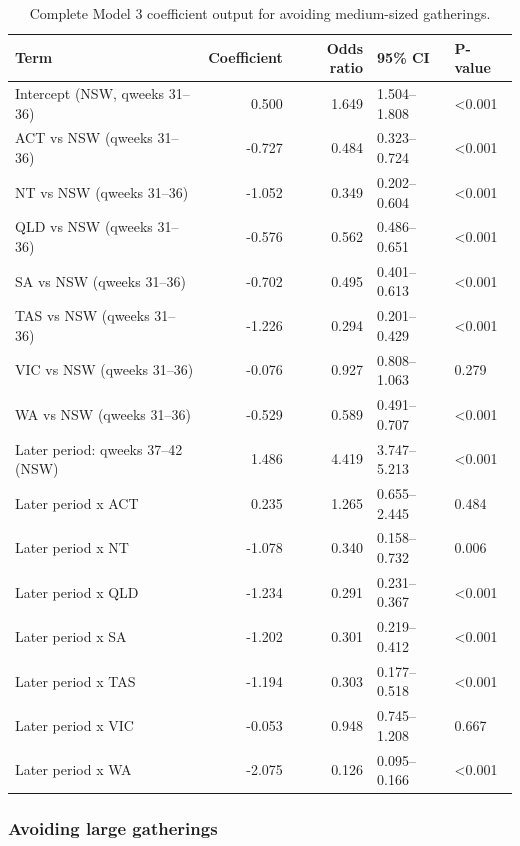 \documentclass[
  12pt,
  a4paper,
]{article}
\begin{document}
\begin{longtable}[t]{lrrll}
\caption{\label{tab:model3-medium-appendix}Complete Model 3 coefficient output for avoiding medium-sized gatherings.}\\
\toprule
Term & Coefficient & Odds ratio & 95\% CI & P-value\\
\midrule
Intercept (NSW, qweeks 31--36) & 0.500 & 1.649 & 1.504--1.808 & <0.001\\
ACT vs NSW (qweeks 31--36) & -0.727 & 0.484 & 0.323--0.724 & <0.001\\
NT vs NSW (qweeks 31--36) & -1.052 & 0.349 & 0.202--0.604 & <0.001\\
QLD vs NSW (qweeks 31--36) & -0.576 & 0.562 & 0.486--0.651 & <0.001\\
SA vs NSW (qweeks 31--36) & -0.702 & 0.495 & 0.401--0.613 & <0.001\\
\addlinespace
TAS vs NSW (qweeks 31--36) & -1.226 & 0.294 & 0.201--0.429 & <0.001\\
VIC vs NSW (qweeks 31--36) & -0.076 & 0.927 & 0.808--1.063 & 0.279\\
WA vs NSW (qweeks 31--36) & -0.529 & 0.589 & 0.491--0.707 & <0.001\\
Later period: qweeks 37--42 (NSW) & 1.486 & 4.419 & 3.747--5.213 & <0.001\\
Later period x ACT & 0.235 & 1.265 & 0.655--2.445 & 0.484\\
\addlinespace
Later period x NT & -1.078 & 0.340 & 0.158--0.732 & 0.006\\
Later period x QLD & -1.234 & 0.291 & 0.231--0.367 & <0.001\\
Later period x SA & -1.202 & 0.301 & 0.219--0.412 & <0.001\\
Later period x TAS & -1.194 & 0.303 & 0.177--0.518 & <0.001\\
Later period x VIC & -0.053 & 0.948 & 0.745--1.208 & 0.667\\
\addlinespace
Later period x WA & -2.075 & 0.126 & 0.095--0.166 & <0.001\\
\bottomrule
\end{longtable}

\clearpage

\subsubsection{Avoiding large gatherings}\label{avoiding-large-gatherings}
\end{document}
